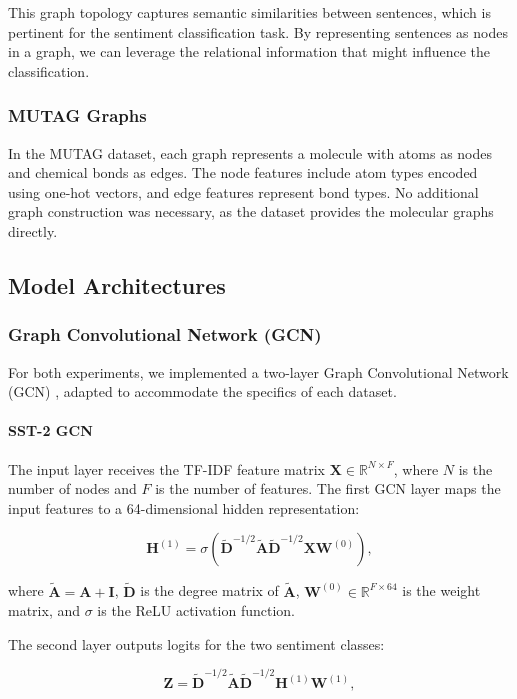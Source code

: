 \documentclass{article}
\begin{document}
This graph topology captures semantic similarities between sentences, which is pertinent for the sentiment classification task. By representing sentences as nodes in a graph, we can leverage the relational information that might influence the classification.

\subsubsection{MUTAG Graphs}
In the MUTAG dataset, each graph represents a molecule with atoms as nodes and chemical bonds as edges. The node features include atom types encoded using one-hot vectors, and edge features represent bond types. No additional graph construction was necessary, as the dataset provides the molecular graphs directly.

\subsection{Model Architectures}
\subsubsection{Graph Convolutional Network (GCN)}
For both experiments, we implemented a two-layer Graph Convolutional Network (GCN) \cite{kipf2016semi}, adapted to accommodate the specifics of each dataset.

\paragraph{SST-2 GCN}
The input layer receives the TF-IDF feature matrix $\mathbf{X} \in \mathbb{R}^{N \times F}$, where $N$ is the number of nodes and $F$ is the number of features. The first GCN layer maps the input features to a 64-dimensional hidden representation:

\[
\mathbf{H}^{(1)} = \sigma\left( \mathbf{\tilde{D}}^{-1/2} \mathbf{\tilde{A}} \mathbf{\tilde{D}}^{-1/2} \mathbf{X} \mathbf{W}^{(0)} \right),
\]

where $\mathbf{\tilde{A}} = \mathbf{A} + \mathbf{I}$, $\mathbf{\tilde{D}}$ is the degree matrix of $\mathbf{\tilde{A}}$, $\mathbf{W}^{(0)} \in \mathbb{R}^{F \times 64}$ is the weight matrix, and $\sigma$ is the ReLU activation function.

The second layer outputs logits for the two sentiment classes:

\[
\mathbf{Z} = \mathbf{\tilde{D}}^{-1/2} \mathbf{\tilde{A}} \mathbf{\tilde{D}}^{-1/2} \mathbf{H}^{(1)} \mathbf{W}^{(1)},
\]
\end{document}
